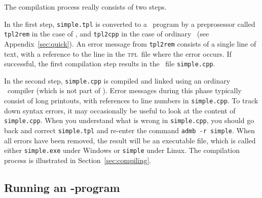 \documentclass{admbmanual}
\begin{document}
The compilation process really consists of two steps.

In the first step, \texttt{simple.tpl} is converted to a \cplus\ program by a
preprosessor called \texttt{tpl2rem} in the case of \scAR, and \texttt{tpl2cpp}
in the case of ordinary \scAB\ (see Appendix~\ref{sec:quick}). An error message
from \texttt{tpl2rem} consists of a single line of text, with a reference to the
line in the \textsc{tpl}~file where the error occurs. If successful, the first
compilation step results in the \cplus\ file \texttt{simple.cpp}.

In the second step, \texttt{simple.cpp} is compiled and linked using an ordinary
\cplus\ compiler (which is not part of \scAB). Error messages during this phase
typically consist of long printouts, with references to line numbers in
\texttt{simple.cpp}. To track down syntax errors, it may occasionally be useful
to look at the content of \texttt{simple.cpp}. When you understand what is wrong
in \texttt{simple.cpp}, you should go back and correct \texttt{simple.tpl} and
re-enter the command \texttt{admb -r simple}. When all errors have been removed,
the result will be an executable file, which is called either
\texttt{simple.exe} under Windows or \texttt{simple} under Linux. The
compilation process is illustrated in Section~\ref{sec:compiling}.

\subsection{Running an \scAB-program}
\end{document}

